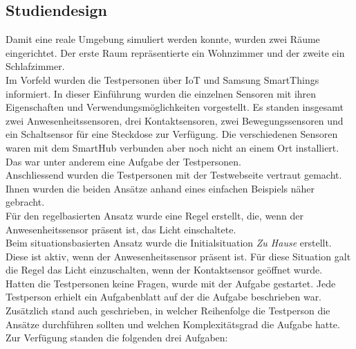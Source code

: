 \subsection{Studiendesign}
Damit eine reale Umgebung simuliert werden konnte, wurden zwei Räume eingerichtet. Der erste Raum repräsentierte ein Wohnzimmer und der zweite ein Schlafzimmer.\\
%
Im Vorfeld wurden die Testpersonen über IoT und Samsung SmartThings informiert. In dieser Einführung wurden die einzelnen Sensoren mit ihren Eigenschaften und Verwendungsmöglichkeiten vorgestellt. Es standen insgesamt zwei Anwesenheitssensoren, drei Kontaktsensoren, zwei Bewegungssensoren und ein Schaltsensor für eine Steckdose zur Verfügung. Die verschiedenen Sensoren waren mit dem SmartHub verbunden aber noch nicht an einem Ort installiert. Das war unter anderem eine Aufgabe der Testpersonen.\\
Anschliessend wurden die Testpersonen mit der Testwebseite vertraut gemacht. Ihnen wurden die beiden Ansätze anhand eines einfachen Beispiels näher gebracht.\\
Für den regelbasierten Ansatz wurde eine Regel erstellt, die, wenn der Anwesenheitssensor präsent ist, das Licht einschaltete.\\
Beim situationsbasierten Ansatz wurde die Initialsituation \textit{Zu Hause} erstellt. Diese ist aktiv, wenn der Anwesenheitssensor präsent ist. Für diese Situation galt die Regel das Licht einzuschalten, wenn der Kontaktsensor geöffnet wurde.\\[2ex]
%
Hatten die Testpersonen keine Fragen, wurde mit der Aufgabe gestartet. Jede Testperson erhielt ein Aufgabenblatt auf der die Aufgabe beschrieben war. Zusätzlich stand auch geschrieben, in welcher Reihenfolge die Testperson die Ansätze durchführen sollten und welchen Komplexitätsgrad die Aufgabe hatte.\\[2ex]
%
Zur Verfügung standen die folgenden drei Aufgaben:
\clearpage

